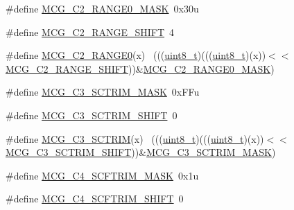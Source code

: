 \begin{DoxyCompactItemize}
\item 
\#define \hyperlink{group___m_c_g___register___masks_ga5436f4e93034d8536c23eabcac1b1a43}{M\+C\+G\+\_\+\+C2\+\_\+\+R\+A\+N\+G\+E0\+\_\+\+M\+A\+SK}~0x30u
\item 
\#define \hyperlink{group___m_c_g___register___masks_ga0198b0ee825233bd73c2681c2072e5d6}{M\+C\+G\+\_\+\+C2\+\_\+\+R\+A\+N\+G\+E\+\_\+\+S\+H\+I\+FT}~4
\item 
\#define \hyperlink{group___m_c_g___register___masks_gad9be2e7ac8a4e19b0d6607e433157a51}{M\+C\+G\+\_\+\+C2\+\_\+\+R\+A\+N\+G\+E0}(x)                                                ~(((\hyperlink{_p_e___types_8h_aba7bc1797add20fe3efdf37ced1182c5}{uint8\+\_\+t})(((\hyperlink{_p_e___types_8h_aba7bc1797add20fe3efdf37ced1182c5}{uint8\+\_\+t})(x))$<$$<$\hyperlink{group___m_c_g___register___masks_ga0198b0ee825233bd73c2681c2072e5d6}{M\+C\+G\+\_\+\+C2\+\_\+\+R\+A\+N\+G\+E\+\_\+\+S\+H\+I\+FT}))\&\hyperlink{group___m_c_g___register___masks_ga5436f4e93034d8536c23eabcac1b1a43}{M\+C\+G\+\_\+\+C2\+\_\+\+R\+A\+N\+G\+E0\+\_\+\+M\+A\+SK})
\item 
\#define \hyperlink{group___m_c_g___register___masks_ga44433c6372539508fbf3090b591f3d89}{M\+C\+G\+\_\+\+C3\+\_\+\+S\+C\+T\+R\+I\+M\+\_\+\+M\+A\+SK}~0x\+F\+Fu
\item 
\#define \hyperlink{group___m_c_g___register___masks_ga8b5c3c55be188745fefec24b945110b7}{M\+C\+G\+\_\+\+C3\+\_\+\+S\+C\+T\+R\+I\+M\+\_\+\+S\+H\+I\+FT}~0
\item 
\#define \hyperlink{group___m_c_g___register___masks_ga6b77fdc5ccef1d81f2f78baa917b117c}{M\+C\+G\+\_\+\+C3\+\_\+\+S\+C\+T\+R\+IM}(x)                                              ~(((\hyperlink{_p_e___types_8h_aba7bc1797add20fe3efdf37ced1182c5}{uint8\+\_\+t})(((\hyperlink{_p_e___types_8h_aba7bc1797add20fe3efdf37ced1182c5}{uint8\+\_\+t})(x))$<$$<$\hyperlink{group___m_c_g___register___masks_ga8b5c3c55be188745fefec24b945110b7}{M\+C\+G\+\_\+\+C3\+\_\+\+S\+C\+T\+R\+I\+M\+\_\+\+S\+H\+I\+FT}))\&\hyperlink{group___m_c_g___register___masks_ga44433c6372539508fbf3090b591f3d89}{M\+C\+G\+\_\+\+C3\+\_\+\+S\+C\+T\+R\+I\+M\+\_\+\+M\+A\+SK})
\item 
\#define \hyperlink{group___m_c_g___register___masks_ga7386e83fdee774ec5d6ec402bae1e432}{M\+C\+G\+\_\+\+C4\+\_\+\+S\+C\+F\+T\+R\+I\+M\+\_\+\+M\+A\+SK}~0x1u
\item 
\#define \hyperlink{group___m_c_g___register___masks_ga1114052674119b01137ef4b4885ab757}{M\+C\+G\+\_\+\+C4\+\_\+\+S\+C\+F\+T\+R\+I\+M\+\_\+\+S\+H\+I\+FT}~0
\item 

\end{DoxyCompactItemize}
